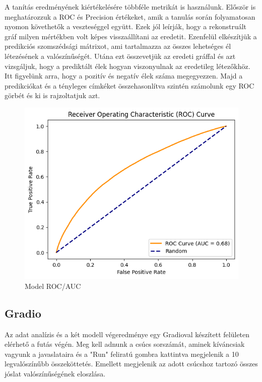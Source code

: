 \documentclass{article}
\begin{document}
		\par A tanítás eredményének kiértékelésére többféle metrikát is használunk. Először is meghatározzuk a ROC és Precision értékeket, amik a tanulás során folyamatosan nyomon követhetők a veszteséggel együtt. Ezek jól leírják, hogy a rekonstruált gráf milyen mértékben volt képes visszaállítani az eredetit. Ezenfelül elkészítjük a predikciós szomszédsági mátrixot, ami tartalmazza az összes lehetséges él létezésének a valószínűségét. Utána ezt összevetjük az eredeti gráffal és azt vizsgáljuk, hogy a prediktált élek hogyan viszonyulnak az eredetileg létezőkhöz. Itt figyelünk arra, hogy a pozitív és negatív élek száma megegyezzen. Majd a predikciókat és a tényleges címkéket összehasonlítva szintén számolunk egy ROC görbét és ki is rajzoltatjuk azt.
		
		\begin{figure}[H]
			\centering
			\includegraphics[width=0.6\linewidth]{Figures/model_roc_auc.png}
			\caption{Model ROC/AUC}
		\end{figure}
	
		\newpage
		\subsection{Gradio}
		
			\par Az adat analízis és a két modell végeredménye egy Gradioval készített felületen elérhető a futás végén. Meg kell adnunk a csúcs sorszámát, aminek kíváncsiak vagyunk a javaslataira és a "Run" feliratú gombra kattintva megjelenik a 10 legvalószínűbb összeköttetés. Emellett megjelenik az adott csúcshoz tartozó összes jóslat valószínűségének eloszlása.
			
\end{document}

